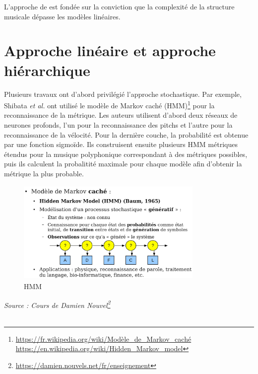 L'approche de \cite{foscarin:hal-01988990} est fondée sur la conviction 
que la complexité de la structure musicale dépasse les modèles linéaires.

\section{Approche linéaire et approche hiérarchique}
Plusieurs travaux ont d’abord privilégié l’approche stochastique. Par exemple, Shibata \textit{et al.} \cite{SHIBATA2021262} ont utilisé le modèle de Markov caché (HMM)\footnote{\url{https://fr.wikipedia.org/wiki/Modèle_de_Markov_caché}\\\url{https://en.wikipedia.org/wiki/Hidden_Markov_model}} pour la reconnaissance de la métrique. Les auteurs utilisent d’abord deux réseaux de neurones profonds, l’un pour la reconnaissance des pitchs et l’autre pour la reconnaissance de la vélocité. 
Pour la dernière couche, la probabilité est obtenue par une fonction sigmoïde. Ils construisent ensuite plusieurs HMM métriques étendus pour la musique polyphonique correspondant à des métriques possibles, puis ils calculent la probalitité maximale pour chaque modèle afin d’obtenir la métrique la plus probable.\newpage

\begin{figure}[h]
	\centering
	\includegraphics[height=50mm, width=90mm]{z_images/2_etat_de_l_art/0_hmm.png}
	\caption{HMM}
\end{figure}
\textit{Source : Cours de Damien Nouvel\footnote{\url{https://damien.nouvels.net/fr/enseignement}}}\\\\

